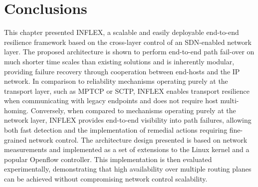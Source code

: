 \section{Conclusions}
\label{section:conc}

This chapter presented INFLEX, a scalable and easily deployable end-to-end resilience framework based on the cross-layer control of an \ac{SDN}-enabled network layer.
The proposed architecture is shown to perform end-to-end path fail-over on much shorter time scales than existing solutions and is inherently modular, providing failure recovery through cooperation between end-hosts and the \ac{IP} network. 
In comparison to reliability mechanisms operating purely at the transport layer, such as \ac{MPTCP} or \ac{SCTP}, INFLEX enables transport resilience when communicating with legacy endpoints and does not require host multi-homing. 
Conversely, when compared to mechanisms operating purely at the network layer, INFLEX provides end-to-end visibility into path failures, allowing both fast detection and the implementation of remedial actions requiring fine-grained network control. 
The architecture  design presented is based on network measurements and implemented as a set of extensions to the Linux kernel and a popular Openflow controller. 
This implementation is then evaluated experimentally, demonstrating that high availability over multiple routing planes can be achieved without compromising network control scalability.
